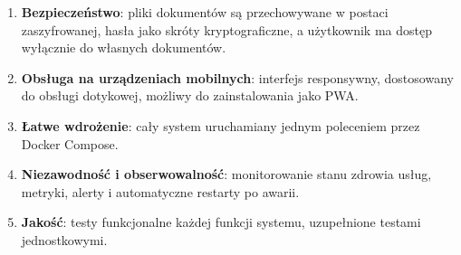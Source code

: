 \begin{enumerate}
  \item \textbf{Bezpieczeństwo}: pliki dokumentów są przechowywane
        w postaci zaszyfrowanej, hasła jako skróty kryptograficzne, a użytkownik
        ma dostęp wyłącznie do własnych dokumentów.
  \item \textbf{Obsługa na urządzeniach mobilnych}: interfejs responsywny,
        dostosowany do obsługi dotykowej, możliwy do zainstalowania jako PWA.
  \item \textbf{Łatwe wdrożenie}: cały system uruchamiany jednym poleceniem
        przez Docker Compose.
  \item \textbf{Niezawodność i obserwowalność}: monitorowanie stanu zdrowia
        usług, metryki, alerty i automatyczne restarty po awarii.
  \item \textbf{Jakość}: testy funkcjonalne każdej funkcji systemu,
        uzupełnione testami jednostkowymi.
\end{enumerate}
